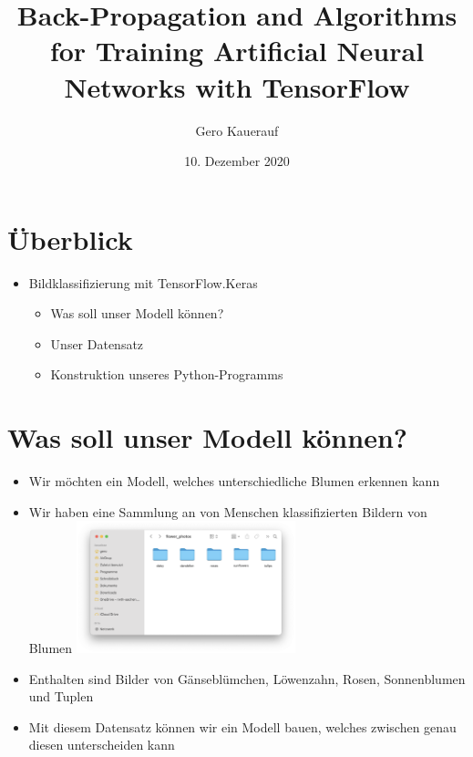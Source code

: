 \documentclass[t]{beamer}
\begin{document}

\title{Back-Propagation and Algorithms for Training Artificial Neural Networks with TensorFlow}
\date{10. Dezember 2020}
\author{Gero Kauerauf}

\frame{\titlepage}

\section{Überblick}
\begin{frame}
    \begin{itemize}
        \item Bildklassifizierung mit TensorFlow.Keras
        \begin{itemize}
            \item Was soll unser Modell können?
            \item Unser Datensatz
            \item Konstruktion unseres Python-Programms
        \end{itemize}
    \end{itemize}
\end{frame}

\section{Was soll unser Modell können?}
\begin{frame}
    \begin{itemize}
        \item Wir möchten ein Modell, welches unterschiedliche Blumen erkennen kann
        \item Wir haben eine Sammlung an von Menschen klassifizierten Bildern von Blumen
        \includegraphics[width=0.5\textwidth]{teach-plots/flower-photos}
        \item Enthalten sind Bilder von Gänseblümchen, Löwenzahn, Rosen, Sonnenblumen und Tuplen
        \item Mit diesem Datensatz können wir ein Modell bauen, welches zwischen genau diesen unterscheiden kann
    \end{itemize}
\end{frame}
\end{document}
